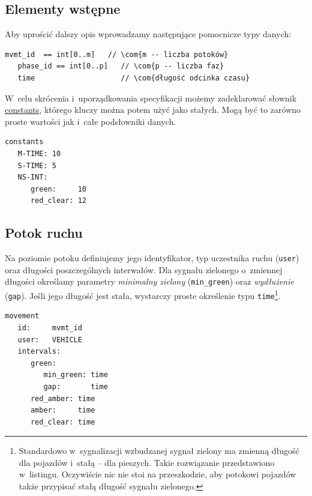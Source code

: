 \documentclass{pracamgr}
\theoremstyle{plain}
\newcommand{\com}[1]{\upshape\color{light-gray}{#1}}
\begin{document}
\subsection{Elementy wstępne}
Aby uprościć dalszy opis wprowadzamy następujące pomocnicze typy danych:
\begin{lstlisting}[caption=Pomocnicze typy danych.]
   mvmt_id  == int[0..m]   // \com{m -- liczba potoków}
   phase_id == int[0..p]   // \com{p -- liczba faz}
   time                    // \com{długość odcinka czasu}
\end{lstlisting}

W~celu skrócenia i~uporządkowania specyfikacji możemy zadeklarować słownik
\url{constants}, którego kluczy można potem użyć jako stałych. Mogą
być to zarówno proste wartości jak i~całe podsłowniki danych.

\noindent\begin{minipage}{1.0\linewidth}
\begin{lstlisting}[caption=Przykładowy słownik stałych.]
constants
   M-TIME: 10
   S-TIME: 5
   NS-INT:
      green:     10
      red_clear: 12
\end{lstlisting}
\end{minipage}

\subsection{Potok ruchu}
Na poziomie potoku definiujemy jego identyfikator, typ uczestnika
ruchu (\texttt{user}) oraz długości poszczególnych interwałów.  Dla
sygnału zielonego o~zmiennej długości określamy parametry
\emph{minimalny zielony} (\texttt{min\_green}) oraz \emph{wydłużenie}
(\texttt{gap}). Jeśli jego długość jest stała, wystarczy proste
określenie typu \texttt{time}\footnote{Standardowo w~sygnalizacji
  wzbudzanej sygnał zielony ma zmienną długość dla pojazdów i~stałą --
dla pieszych. Takie rozwiązanie przedstawiono w~listingu. Oczywiście
nic nie stoi na przeszkodzie, aby potokowi pojazdów także przypisać
stałą długość sygnału zielonego.}.

\noindent\begin{minipage}{1.0\linewidth}
\begin{lstlisting}[caption=Schemat opisu potoku pojazdów.]
movement
   id:     mvmt_id
   user:   VEHICLE
   intervals:
      green:
         min_green: time
         gap:       time
      red_amber: time
      amber:     time
      red_clear: time
\end{lstlisting}
\end{minipage}
\end{document}
